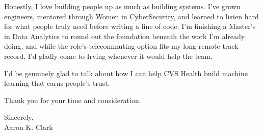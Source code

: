 \documentclass{resume}
\begin{document}
Honestly, I love building people up as much as building systems. I've grown engineers, mentored through Women in CyberSecurity, and learned to listen hard for what people truly need before writing a line of code. I'm finishing a Master's in Data Analytics to round out the foundation beneath the work I'm already doing, and while the role's telecommuting option fits my long remote track record, I'd gladly come to Irving whenever it would help the team.

I'd be genuinely glad to talk about how I can help CVS Health build machine learning that earns people's trust.

\bigskip
\noindent Thank you for your time and consideration.

\bigskip
\noindent Sincerely, \\[1em]
Aaron K. Clark
\end{document}

